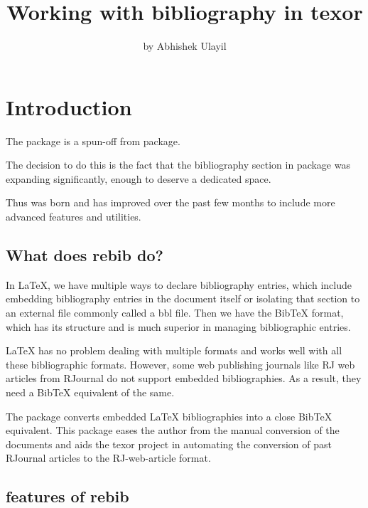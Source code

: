 \title{Working with bibliography in texor}
\author{by Abhishek Ulayil}

\maketitle


\section{Introduction}
The  package is a spun-off from  package.

The decision to do this is the fact that the bibliography section 
in  package was expanding significantly, enough to deserve a dedicated space.

Thus  was born and has improved over the past few months to include more advanced features and utilities. 

\subsection{What does rebib do?}

In LaTeX, we have multiple ways to declare bibliography entries, which include embedding bibliography entries in the document itself or isolating that section to an external file commonly called a bbl file. Then we have the BibTeX format, which has its structure and is much superior in managing bibliographic entries.

LaTeX has no problem dealing with multiple formats and works well with all these bibliographic formats. However, some web publishing journals like RJ web articles from RJournal do not support embedded bibliographies. As a result, they need a BibTeX equivalent of the same.

The  package converts embedded LaTeX bibliographies into a close  BibTeX equivalent. This package eases the author from the manual conversion of the documents and aids the texor project in automating the conversion of past RJournal articles to the RJ-web-article format.

\subsection{features of rebib}

